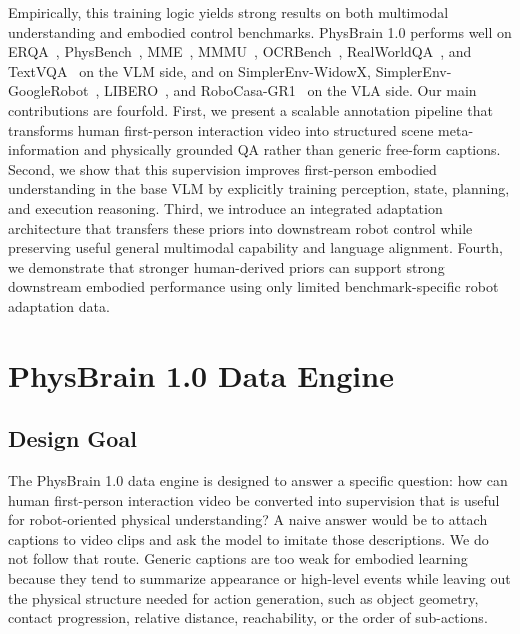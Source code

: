 Empirically, this training logic yields strong results on both multimodal understanding and embodied control benchmarks. PhysBrain 1.0 performs well on ERQA~\cite{GoogleRobotics_2025_arxiv}, PhysBench~\cite{PhysBench_2025_arXiv}, MME~\cite{MME_2023_arXiv}, MMMU~\cite{MMMU_2024_CVPR}, OCRBench~\cite{OCRBenchV2_2025_arXiv}, RealWorldQA~\cite{realworldqa2024}, and TextVQA~\cite{TextVQA_2019_CVPR} on the VLM side, and on SimplerEnv-WidowX, SimplerEnv-GoogleRobot~\cite{SimplerEnv_2024_CoRL}, LIBERO~\cite{LIBERO_2023_NeurIPS}, and RoboCasa-GR1~\cite{RoboCasa_2024_RSS, GR00T_2025_arXiv} on the VLA side. Our main contributions are fourfold. First, we present a scalable annotation pipeline that transforms human first-person interaction video into structured scene meta-information and physically grounded QA rather than generic free-form captions. Second, we show that this supervision improves first-person embodied understanding in the base VLM by explicitly training perception, state, planning, and execution reasoning. Third, we introduce an integrated adaptation architecture that transfers these priors into downstream robot control while preserving useful general multimodal capability and language alignment. Fourth, we demonstrate that stronger human-derived priors can support strong downstream embodied performance using only limited benchmark-specific robot adaptation data.

\section{PhysBrain 1.0 Data Engine}
\label{sec:data_engine}

\subsection{Design Goal}

The PhysBrain 1.0 data engine is designed to answer a specific question: how can human first-person interaction video be converted into supervision that is useful for robot-oriented physical understanding? A naive answer would be to attach captions to video clips and ask the model to imitate those descriptions. We do not follow that route. Generic captions are too weak for embodied learning because they tend to summarize appearance or high-level events while leaving out the physical structure needed for action generation, such as object geometry, contact progression, relative distance, reachability, or the order of sub-actions.

